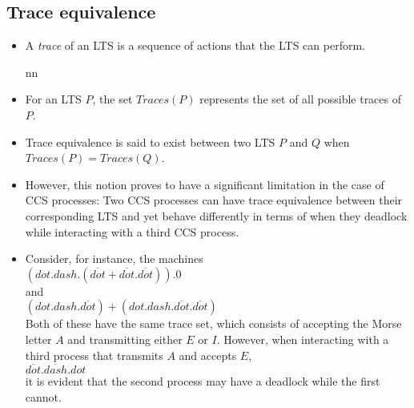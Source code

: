 \documentclass{article}
\begin{document}
\subsection{Trace equivalence}
  \begin{itemize}

  \item A \emph{trace} of an LTS is a sequence of actions
    that the LTS can perform.

nn  \item For an LTS $P$, the set $Traces(P)$ represents the set of all
    possible traces of $P$.
  \item Trace equivalence is said to exist between two LTS $P$ and $Q$
    when $Traces(P) = Traces(Q)$.
  \item However, this notion proves to have a significant limitation
    in the case of CCS processes: Two CCS processes can have trace equivalence
    between their corresponding LTS and yet behave differently in
    terms of when they deadlock while interacting with a third CCS
    process.
  \item Consider, for instance, the machines \\
    $(dot.dash.(\overline{dot}+\overline{dot}.\overline{dot})).0$\\
    and\\
    $(dot.dash.\overline{dot})+(dot.dash.\overline{dot}.\overline{dot})$\\
    Both of these have the same trace set, which consists of accepting
    the Morse letter $A$ and transmitting either $E$ or $I$. However, when
    interacting with a third process that transmits $A$ and accepts
    $E$, \\
    $\overline{dot}.\overline{dash}.dot$\\
    it is evident that the second process may have a deadlock while
    the first cannot.
  \end{itemize}
\end{document}
